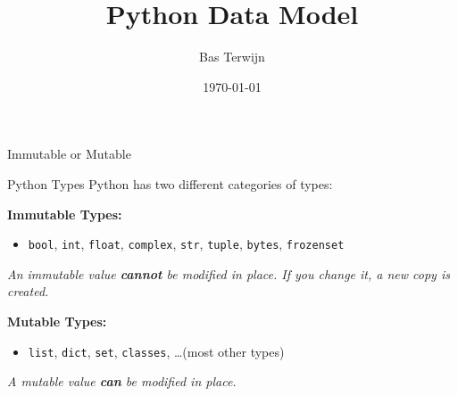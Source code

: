 \documentclass[10pt]{beamer}
\title{Python Data Model}
\author{Bas Terwijn}
\date{\today}
\begin{document}
\begin{frame}
    \titlepage
\end{frame}
\begin{frame}{Immutable or Mutable}
    \begin{block}{Python Types}
        Python has two different categories of types:
    \end{block}

    \vspace{1em}
    
    \textbf{Immutable Types:}
    \begin{itemize}
        \item \texttt{bool}, \texttt{int}, \texttt{float}, \texttt{complex}, \texttt{str}, \texttt{tuple}, \texttt{bytes}, \texttt{frozenset}
    \end{itemize}
    \textit{An immutable value \textbf{cannot} be modified in place. If you change it, a new copy is created.}
    
    \vspace{1em}
    
    \textbf{Mutable Types:}
    \begin{itemize}
        \item \texttt{list}, \texttt{dict}, \texttt{set}, \texttt{classes}, \dots (most other types) 
    \end{itemize}
    \textit{A mutable value \textbf{can} be modified in place.}
    
\end{frame}
\end{document}
